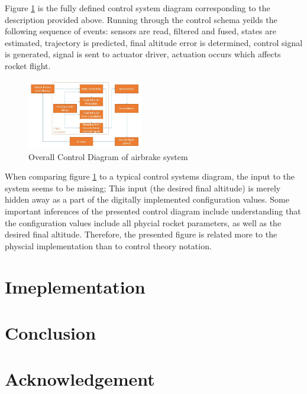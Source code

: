 \documentclass[conference, letterpaper]{IEEEtran}
\begin{document}
Figure \ref{fig:MPC_diagram} is the fully defined control system diagram
corresponding to the description provided above. Running through the control
schema yeilds the following sequence of events: sensors are read, filtered and
fused, states are estimated, trajectory is predicted, final altitude error is
determined, control signal is generated, signal is sent to actuator driver,
actuation occurs which affects rocket flight.

\begin{figure}[H]
\centering
\includegraphics[width=0.45\textwidth]{./MPC_diagram}
\caption{Overall Control Diagram of airbrake system}
\label{fig:MPC_diagram}
\end{figure}

When comparing figure \ref{fig:MPC_diagram} to a
typical control systems diagram, the input to the system seems to be missing;
This input (the desired final altitude) is merely hidden away as a part of the
digitally implemented configuration values. Some important inferences of the
presented control diagram include understanding that the configuration values
include all phycial rocket parameters, as well as the desired final altitude.
Therefore, the presented figure is related more to the physcial implementation
than to control theory notation.

\section{Imeplementation}



\section{Conclusion}

\section{Acknowledgement}



\end{document}
